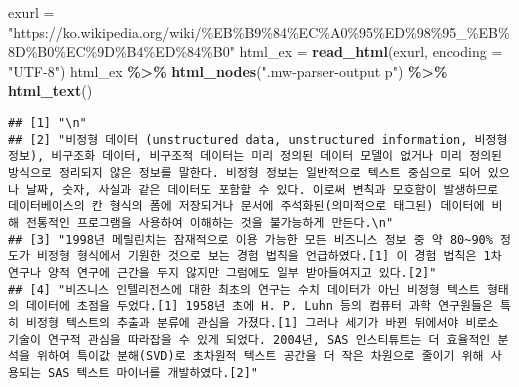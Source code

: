 \documentclass[
]{article}
\newenvironment{Shaded}{\begin{snugshade}}{\end{snugshade}}
\newcommand{\AttributeTok}[1]{\textcolor[rgb]{0.13,0.29,0.53}{#1}}
\newcommand{\FunctionTok}[1]{\textcolor[rgb]{0.13,0.29,0.53}{\textbf{#1}}}
\newcommand{\NormalTok}[1]{#1}
\newcommand{\OtherTok}[1]{\textcolor[rgb]{0.56,0.35,0.01}{#1}}
\newcommand{\SpecialCharTok}[1]{\textcolor[rgb]{0.81,0.36,0.00}{\textbf{#1}}}
\newcommand{\StringTok}[1]{\textcolor[rgb]{0.31,0.60,0.02}{#1}}
\begin{document}
\begin{Shaded}
\begin{Highlighting}[]
\NormalTok{exurl }\OtherTok{=} \StringTok{"https://ko.wikipedia.org/wiki/\%EB\%B9\%84\%EC\%A0\%95\%ED\%98\%95\_\%EB\%8D\%B0\%EC\%9D\%B4\%ED\%84\%B0"}
\NormalTok{html\_ex }\OtherTok{=} \FunctionTok{read\_html}\NormalTok{(exurl, }\AttributeTok{encoding =} \StringTok{"UTF{-}8"}\NormalTok{)}
\NormalTok{html\_ex }\SpecialCharTok{\%\textgreater{}\%} \FunctionTok{html\_nodes}\NormalTok{(}\StringTok{".mw{-}parser{-}output p"}\NormalTok{) }\SpecialCharTok{\%\textgreater{}\%} \FunctionTok{html\_text}\NormalTok{()}
\end{Highlighting}
\end{Shaded}

\begin{verbatim}
## [1] "\n"                                                                                                                                                                                                                                                                                                                                                                                                                                                                                               
## [2] "비정형 데이터 (unstructured data, unstructured information, 비정형 정보), 비구조화 데이터, 비구조적 데이터는 미리 정의된 데이터 모델이 없거나 미리 정의된 방식으로 정리되지 않은 정보를 말한다. 비정형 정보는 일반적으로 텍스트 중심으로 되어 있으나 날짜, 숫자, 사실과 같은 데이터도 포함할 수 있다. 이로써 변칙과 모호함이 발생하므로 데이터베이스의 칸 형식의 폼에 저장되거나 문서에 주석화된(의미적으로 태그된) 데이터에 비해 전통적인 프로그램을 사용하여 이해하는 것을 불가능하게 만든다.\n"
## [3] "1998년 메릴린치는 잠재적으로 이용 가능한 모든 비즈니스 정보 중 약 80~90% 정도가 비정형 형식에서 기원한 것으로 보는 경험 법칙을 언급하였다.[1] 이 경험 법칙은 1차 연구나 양적 연구에 근간을 두지 않지만 그럼에도 일부 받아들여지고 있다.[2]"                                                                                                                                                                                                                                                       
## [4] "비즈니스 인텔리전스에 대한 최초의 연구는 수치 데이터가 아닌 비정형 텍스트 형태의 데이터에 초점을 두었다.[1] 1958년 초에 H. P. Luhn 등의 컴퓨터 과학 연구원들은 특히 비정형 텍스트의 추출과 분류에 관심을 가졌다.[1] 그러나 세기가 바뀐 뒤에서야 비로소 기술이 연구적 관심을 따라잡을 수 있게 되었다. 2004년, SAS 인스티튜트는 더 효율적인 분석을 위하여 특이값 분해(SVD)로 초차원적 텍스트 공간을 더 작은 차원으로 줄이기 위해 사용되는 SAS 텍스트 마이너를 개발하였다.[2]"
\end{verbatim}
\end{document}
